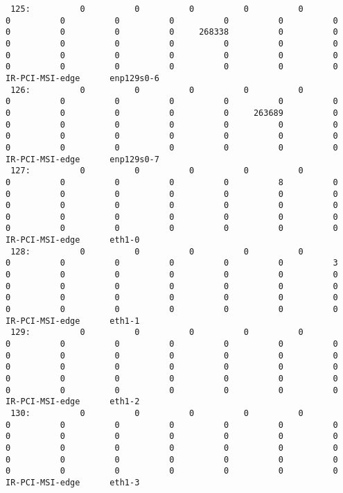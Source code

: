 \begin{lstlisting}
 125:          0          0          0          0          0          0          0          0          0          0          0          0          0          0          0          0     268338          0          0          0          0          0          0          0          0          0          0          0          0          0          0          0          0          0          0          0          0          0          0          0  IR-PCI-MSI-edge      enp129s0-6
 126:          0          0          0          0          0          0          0          0          0          0          0          0          0          0          0          0          0     263689          0          0          0          0          0          0          0          0          0          0          0          0          0          0          0          0          0          0          0          0          0          0  IR-PCI-MSI-edge      enp129s0-7
 127:          0          0          0          0          0          0          0          0          0          0          8          0          0          0          0          0          0          0          0          0          0          0          0          0          0          0          0          0          0          0          0          0          0          0          0          0          0          0          0          0  IR-PCI-MSI-edge      eth1-0
 128:          0          0          0          0          0          0          0          0          0          0          0          3          0          0          0          0          0          0          0          0          0          0          0          0          0          0          0          0          0          0          0          0          0          0          0          0          0          0          0          0  IR-PCI-MSI-edge      eth1-1
 129:          0          0          0          0          0          0          0          0          0          0          0          0          0          0          0          0          0          0          0          0          0          0          0          0          0          0          0          0          0          0          0          0          0          0          0          0          0          0          0          0  IR-PCI-MSI-edge      eth1-2
 130:          0          0          0          0          0          0          0          0          0          0          0          0          0          0          0          0          0          0          0          0          0          0          0          0          0          0          0          0          0          0          0          0          0          0          0          0          0          0          0          0  IR-PCI-MSI-edge      eth1-3

\end{lstlisting}
